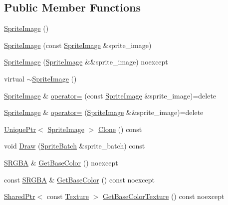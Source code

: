 \subsection*{Public Member Functions}
\begin{DoxyCompactItemize}
\item 
\hyperlink{classmage_1_1_sprite_image_ac5de26e66bf1d1fdd255c2044f097ecf}{Sprite\+Image} ()
\item 
\hyperlink{classmage_1_1_sprite_image_a7ce3b568dc3ff96e7467a8d00bba997d}{Sprite\+Image} (const \hyperlink{classmage_1_1_sprite_image}{Sprite\+Image} \&sprite\+\_\+image)
\item 
\hyperlink{classmage_1_1_sprite_image_a4490dea28c647b80324ea26cc93b2f82}{Sprite\+Image} (\hyperlink{classmage_1_1_sprite_image}{Sprite\+Image} \&\&sprite\+\_\+image) noexcept
\item 
virtual \hyperlink{classmage_1_1_sprite_image_a9121ee110f7e64ee6e936e0d3350ab44}{$\sim$\+Sprite\+Image} ()
\item 
\hyperlink{classmage_1_1_sprite_image}{Sprite\+Image} \& \hyperlink{classmage_1_1_sprite_image_a20d8e8272cf62599f6c0e4b1ff4f3586}{operator=} (const \hyperlink{classmage_1_1_sprite_image}{Sprite\+Image} \&sprite\+\_\+image)=delete
\item 
\hyperlink{classmage_1_1_sprite_image}{Sprite\+Image} \& \hyperlink{classmage_1_1_sprite_image_a9f83e728a93550f6b20bb4d500483171}{operator=} (\hyperlink{classmage_1_1_sprite_image}{Sprite\+Image} \&\&sprite\+\_\+image)=delete
\item 
\hyperlink{namespacemage_a3316d7143a973e37adf1110f2e80ca31}{Unique\+Ptr}$<$ \hyperlink{classmage_1_1_sprite_image}{Sprite\+Image} $>$ \hyperlink{classmage_1_1_sprite_image_a19db9a2a418dd04db0b38d1f8aa7e035}{Clone} () const
\item 
void \hyperlink{classmage_1_1_sprite_image_ae30d3293931f674fea17008063755bb6}{Draw} (\hyperlink{classmage_1_1_sprite_batch}{Sprite\+Batch} \&sprite\+\_\+batch) const
\item 
\hyperlink{structmage_1_1_s_r_g_b_a}{S\+R\+G\+BA} \& \hyperlink{classmage_1_1_sprite_image_a0362a937253ba7a5cd944210aafd9288}{Get\+Base\+Color} () noexcept
\item 
const \hyperlink{structmage_1_1_s_r_g_b_a}{S\+R\+G\+BA} \& \hyperlink{classmage_1_1_sprite_image_a72e5087fc7f6bc1668980c5c35815906}{Get\+Base\+Color} () const noexcept
\item 
\hyperlink{namespacemage_a1e01ae66713838a7a67d30e44c67703e}{Shared\+Ptr}$<$ const \hyperlink{classmage_1_1_texture}{Texture} $>$ \hyperlink{classmage_1_1_sprite_image_a7fa3f86018f033288c755a665ee90bc2}{Get\+Base\+Color\+Texture} () const noexcept

\end{DoxyCompactItemize}
